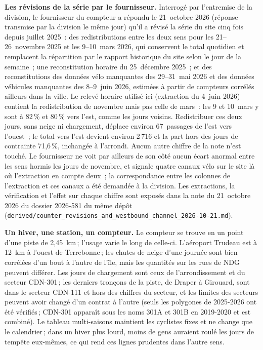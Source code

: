 \documentclass[11pt,letterpaper]{article}
\begin{document}
\textbf{Les révisions de la série par le fournisseur.} Interrogé par
l'entremise de la division, le fournisseur du compteur a répondu le
21~octobre 2026 (réponse transmise par la division le même jour) qu'il a
révisé la série du site cinq fois depuis juillet 2025~: des redistributions
entre les deux sens pour les 21--26~novembre 2025 et les 9--10~mars 2026,
qui conservent le total quotidien et remplacent la répartition par le
rapport historique du site selon le jour de la semaine~; une reconstitution
horaire du 25~décembre 2025~; et des reconstitutions des données vélo
manquantes des 29--31~mai 2026 et des données véhicules manquantes des
8--9~juin 2026, estimées à partir de compteurs corrélés ailleurs dans la
ville. Le relevé horaire utilisé ici (extraction du 4~juin 2026) contient la
redistribution de novembre mais pas celle de mars~: les 9 et 10~mars y sont
à 82\,\% et 80\,\% vers l'est, comme les jours voisins. Redistribuer ces
deux jours, sans neige ni chargement, déplace environ 67~passages de l'est
vers l'ouest~; le total vers l'est devient environ 2\,716 et la part hors
des jours de contrainte 71,6\,\%, inchangée à l'arrondi. Aucun autre
chiffre de la note n'est touché. Le fournisseur ne voit par ailleurs de son
côté aucun écart anormal entre les sens hormis les jours de novembre, et
signale quatre canaux vélo sur le site là où l'extraction en compte deux~;
la correspondance entre les colonnes de l'extraction et ces canaux a été
demandée à la division. Les extractions, la vérification et l'effet sur
chaque chiffre sont exposés dans la note du 21~octobre 2026 du dossier
2026-581 du même dépôt
(\texttt{derived/counter\_revisions\_and\_westbound\_channel\_2026-10-21.md}).


\textbf{Un hiver, une station, un compteur.} Le compteur se trouve en un
point d'une piste de 2,45~km\,; l'usage varie le long de celle-ci.
L'aéroport Trudeau est à 12~km à l'ouest de Terrebonne\,; les chutes de
neige d'une journée sont bien corrélées d'un bout à l'autre de l'île, mais
les quantités sur les rues de NDG peuvent différer. Les jours de
chargement sont ceux de l'arrondissement et du secteur CDN-301\,; les
derniers tronçons de la piste, de Draper à Girouard, sont dans le secteur
CDN-111 et hors des chiffres du secteur, et les limites des secteurs
peuvent avoir changé d'un contrat à
l'autre (seuls les polygones de 2025-2026 ont été vérifiés\,; CDN-301
apparaît sous les noms 301A et 301B en 2019-2020 et est combiné). Le
tableau multi-saisons maintient les cyclistes fixes et ne change que le
calendrier\,; dans un hiver plus lourd, moins de gens auraient roulé les
jours de tempête eux-mêmes, ce qui rend ces lignes prudentes dans l'autre
sens.
\end{document}
